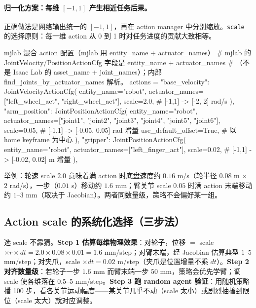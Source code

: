 \paragraph{归一化方案：每维 $[-1,1]$ 产生相近任务后果。}正确做法是网络输出统一的 $[-1,1]$，再在 action manager 中分别缩放。\verb|scale| 的选择原则：每一维 action 从 0 到 1 时对任务进度的贡献大致相等。

\begin{codebox}[Python]{mjlab 混合 action 配置（mjlab 用 entity\_name + actuator\_names）}
# mjlab 的 JointVelocity/PositionActionCfg 字段是 entity_name + actuator_names
# （不是 Isaac Lab 的 asset_name + joint_names）；内部 find_joints_by_actuator_names 解析。
actions = {
    "base_velocity": JointVelocityActionCfg(
        entity_name="robot",
        actuator_names=["left_wheel_act", "right_wheel_act"],
        scale=2.0,                 # [-1,1] -> [-2, 2] rad/s
    ),
    "arm_position": JointPositionActionCfg(
        entity_name="robot",
        actuator_names=["joint1", "joint2", "joint3", "joint4", "joint5", "joint6"],
        scale=0.05,                # [-1,1] -> [-0.05, 0.05] rad 增量
        use_default_offset=True,   # 以 home keyframe 为中心
    ),
    "gripper": JointPositionActionCfg(
        entity_name="robot",
        actuator_names=["left_finger_act"],
        scale=0.02,                # [-1,1] -> [-0.02, 0.02] m 增量
    ),
}
\end{codebox}

举例：轮速 scale $2.0$ 意味着满 action 时底盘速度约 $0.16$ m/s（轮半径 $0.08$ m $\times$ $2$ rad/s），一步（$0.01$ s）移动约 $1.6$ mm；臂关节 scale $0.05$ 时满 action 末端移动约 $1$--$3$ mm（取决于 Jacobian）。两者同数量级，策略不会偏好某一组。

\subsection{Action scale 的系统化选择（三步法）}
\label{sec:rlmc-wh-scale}

选 scale 不靠猜。\textbf{Step 1 估算每维物理效果}：对轮子，位移 $=$ scale $\times r\times dt=2.0\times0.08\times0.01=1.6$ mm/step；对臂末端，经 Jacobian 估算典型 $1$--$5$ mm/step；对夹爪，scale $\times dt=0.02$ m/step（夹爪是位置增量不乘 $dt$）。\textbf{Step 2 对齐数量级}：若轮子一步 $1.6$ mm 而臂末端一步 $50$ mm，策略会优先学臂；调 scale 使各维落在 $0.5$--$5$ mm/step。\textbf{Step 3 跑 random agent 验证}：用随机策略播 100 步，看各关节运动幅度——某关节几乎不动（scale 太小）或剧烈抽搐到限位（scale 太大）就对应调整。

